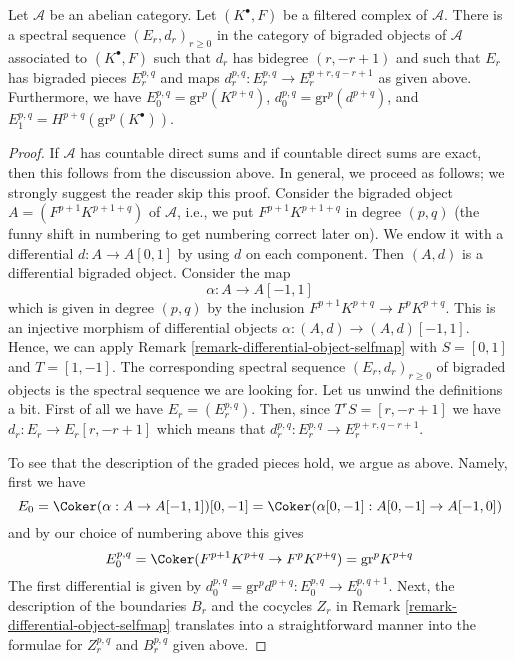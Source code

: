 \begin{lemma}
\label{lemma-spectral-sequence-filtered-complex}
Let $\mathcal{A}$ be an abelian category. Let $(K^\bullet, F)$ be a
filtered complex of $\mathcal{A}$. There is a spectral sequence
$(E_r, d_r)_{r \geq 0}$ in the category of bigraded objects of $\mathcal{A}$
associated to $(K^\bullet, F)$ such that $d_r$ has bidegree $(r, - r + 1)$
and such that $E_r$ has bigraded pieces $E_r^{p, q}$ and maps
$d_r^{p, q} : E_r^{p, q} \to E_r^{p + r, q - r + 1}$ as given above.
Furthermore, we have $E_0^{p, q} = \text{gr}^p(K^{p + q})$,
$d_0^{p, q} = \text{gr}^p(d^{p + q})$,
and $E_1^{p, q} = H^{p + q}(\text{gr}^p(K^\bullet))$.
\end{lemma}

\begin{proof}
If $\mathcal{A}$ has countable direct sums and if countable direct
sums are exact, then this follows from the discussion above.
In general, we proceed as follows; we strongly suggest the reader
skip this proof. Consider the bigraded object $A = (F^{p + 1}K^{p + 1 + q})$
of $\mathcal{A}$, i.e., we put $F^{p + 1}K^{p + 1 + q}$ in degree $(p, q)$
(the funny shift in numbering to get numbering correct later on).
We endow it with a differential $d : A \to A[0, 1]$ by using $d$
on each component. Then $(A, d)$ is a differential bigraded object.
Consider the map
$$
\alpha : A \to A[-1, 1]
$$
which is given in degree $(p, q)$ by the inclusion
$F^{p + 1}K^{p + q} \to F^pK^{p + q}$.
This is an injective morphism of differential objects
$\alpha : (A, d) \to (A, d)[-1, 1]$. Hence, we can apply
Remark \ref{remark-differential-object-selfmap}
with $S = [0, 1]$ and $T = [1, -1]$.
The corresponding spectral sequence $(E_r, d_r)_{r \geq 0}$
of bigraded objects is the spectral sequence we are looking
for. Let us unwind the definitions a bit. First of all we have
$E_r = (E_r^{p, q})$. Then, since $T^rS = [r, -r + 1]$
we have $d_r : E_r \to E_r[r, -r + 1]$ which means that
$d_r^{p, q} : E_r^{p, q} \to E_r^{p + r, q - r + 1}$.

\medskip\noindent
To see that the description of the graded pieces hold, we argue
as above. Namely, first we have
$$
E_0 = \Coker(\alpha : A \to A[-1, 1])[0, -1] =
\Coker(\alpha[0, -1] : A[0, -1] \to A[-1, 0])
$$
and by our choice of numbering above this gives
$$
E_0^{p, q} = \Coker(F^{p + 1}K^{p + q} \to F^pK^{p + q}) = \text{gr}^pK^{p + q}
$$
The first differential is given by
$d_0^{p, q} = \text{gr}^pd^{p + q} : E_0^{p, q} \to E_0^{p, q + 1}$.
Next, the description of the boundaries $B_r$ and the cocycles $Z_r$
in Remark \ref{remark-differential-object-selfmap}
translates into a straightforward manner into the formulae
for $Z_r^{p, q}$ and $B_r^{p, q}$ given above.
\end{proof}

